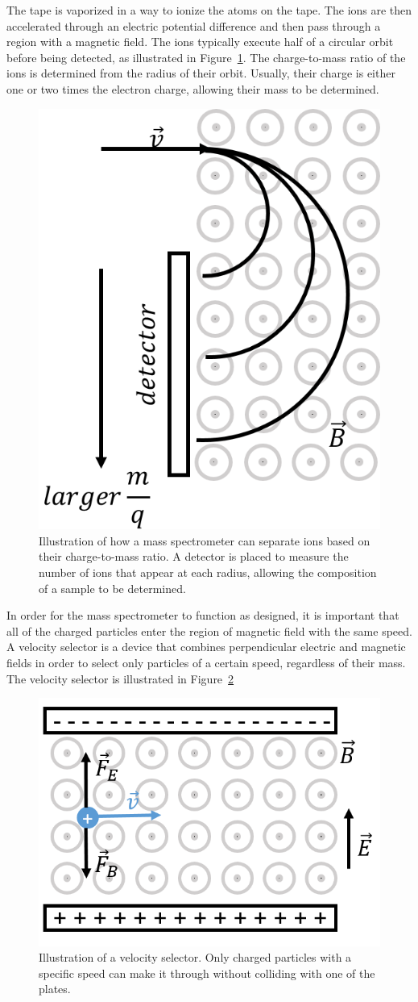 The tape is vaporized in a way to ionize the atoms on the tape. The ions are then accelerated through an electric potential difference and then pass through a region with a magnetic field. The ions typically execute half of a circular orbit before being detected, as illustrated in Figure~\ref{fig:magneticforce:massspec}. The charge-to-mass ratio of the ions is determined from the radius of their orbit. Usually, their charge is either one or two times the electron charge, allowing their mass to be determined.

\begin{figure}[!htbp]
\centering
\includegraphics[width=0.4\linewidth]{files/massspec-154fd37f36c600e9f118cf7854e2640c.png}
\caption[]{Illustration of how a mass spectrometer can separate ions based on their charge-to-mass ratio. A detector is placed to measure the number of ions that appear at each radius, allowing the composition of a sample to be determined.}
\label{fig:magneticforce:massspec}
\end{figure}

In order for the mass spectrometer to function as designed, it is important that all of the charged particles enter the region of magnetic field with the same speed. A velocity selector is a device that combines perpendicular electric and magnetic fields in order to select only particles of a certain speed, regardless of their mass. The velocity selector is illustrated in Figure~\ref{fig:magneticforce:vselector}

\begin{figure}[!htbp]
\centering
\includegraphics[width=0.4\linewidth]{files/vselector-f385c931befd350dfceb4d97c71b0e72.png}
\caption[]{Illustration of a velocity selector. Only charged particles with a specific speed can make it through without colliding with one of the plates.}
\label{fig:magneticforce:vselector}
\end{figure}

